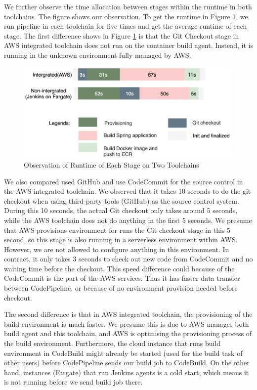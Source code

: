 We further observe the time allocation between stages within the runtime in both toolchains. The figure shows our observation. To get the runtime in Figure \ref{fig:stage_runtime}, we run pipeline in each toolchain for five times and get the average runtime of each stage. The first difference shows in Figure \ref{fig:stage_runtime} is that the Git Checkout stage in AWS integrated toolchain does not run on the container build agent. Instead, it is running in the unknown environment fully managed by AWS.
\begin{figure}[!h]
  \centering
  \includegraphics[width=0.99\textwidth]{pics/stages.png}
  \caption{Observation of Runtime of Each Stage on Two Toolchains}
  \label{fig:stage_runtime}
  \end{figure}
\par
We also compared used GitHub and use CodeCommit for the source control in the AWS integrated toolchain. 
We observed that it takes 10 seconds to do the git checkout when using third-party tools (GitHub) as the source control system. During this 10 seconds, the actual Git checkout only takes around 5 seconds, while the AWS toolchain does not do anything in the first 5 seconds. We presume that AWS provisions environment for runs the Git checkout stage in this 5 second, so this stage is also running in a serverless environment within AWS. However, we are not allowed to configure anything in this environment. In contract, it only takes 3 seconds to check out new code from CodeCommit and no waiting time before the checkout. This speed difference could because of the CodeCommit is the part of the AWS services. Thus it has faster data transfer between CodePipeline, or because of no environment provision needed before checkout.
\par
 The second difference is that in AWS integrated toolchain, the provisioning of the build environment is much faster. We presume this is due to AWS manages both build agent and this toolchain, and AWS is optimising the provisioning process of the build environment. Furthermore, the cloud instance that runs build environment in CodeBuild might already be started (used for the build task of other users) before CodePipeline sends our build job to CodeBuild. On the other hand, instances (Fargate) that run Jenkins agents is a cold start, which means it is not running before we send build job there.
